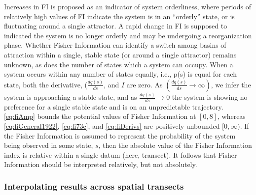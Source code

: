 \documentclass[12pt,twoside,openany]{reedthesis}
\begin{document}
Increases in FI is proposed as an indicator of system orderliness, where periods of relatively high values of FI indicate the system is in an ``orderly'' state, or is fluctuating around a single attractor. A rapid change in FI is supposed to indicated the system is no longer orderly and may be undergoing a reorganization phase. Whether Fisher Information can identify a switch among basins of attraction within a single, stable state (or around a single attractor) remains unknown, as does the number of states which a system can occupy. When a system occurs within any number of states equally, i.e., p(s) is equal for each state, both the derivative, (\(\frac{dq(s)}{ds}\), and \(I\) are zero. As \((\frac{dq(s)}{ds} \rightarrow \infty)\), we infer the system is approaching a stable state, and as \(\frac{dq(s)}{ds} \rightarrow 0\) the system is showing no preference for a single stable state and is on an unpredictable trajectory. \eqref{eq:fiAmp} bounds the potential values of Fisher Information at \([0, 8]\), whereas \eqref{eq:fiGeneral1922}, \eqref{eq:fi73c}, and \eqref{eq:fiDerivs} are positively unbounded \([0, \infty)\). If the Fisher Information is assumed to represent the probability of the system being observed in some state, \(s\), then the absolute value of the Fisher Information index is relative within a single datum (here, transect). It follows that Fisher Information should be interpreted relatively, but not absolutely.

\hypertarget{interpolating-results-across-spatial-transects}{%
\subsubsection{Interpolating results across spatial transects}\label{interpolating-results-across-spatial-transects}}
\end{document}
